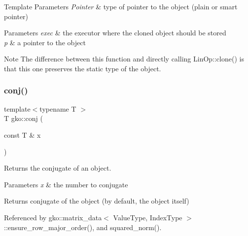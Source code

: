 \begin{DoxyTemplParams}{Template Parameters}
{\em Pointer} & type of pointer to the object (plain or smart pointer)\\
\hline
\end{DoxyTemplParams}

\begin{DoxyParams}{Parameters}
{\em exec} & the executor where the cloned object should be stored \\
\hline
{\em p} & a pointer to the object\\
\hline
\end{DoxyParams}
\begin{DoxyNote}{Note}
The difference between this function and directly calling Lin\+Op\+::clone() is that this one preserves the static type of the object. 
\end{DoxyNote}
\mbox{\label{namespacegko_acdaec5c4f959a948a6d0f3e99a57c7ea}} 
\subsubsection{\texorpdfstring{conj()}{conj()}}
{\footnotesize\ttfamily template$<$typename T $>$ \\
T gko\+::conj (\begin{DoxyParamCaption}\item[{const T \&}]{x }\end{DoxyParamCaption})\hspace{0.3cm}{\ttfamily [inline]}}



Returns the conjugate of an object. 


\begin{DoxyParams}{Parameters}
{\em x} & the number to conjugate\\
\hline
\end{DoxyParams}
\begin{DoxyReturn}{Returns}
conjugate of the object (by default, the object itself) 
\end{DoxyReturn}


Referenced by gko\+::matrix\+\_\+data$<$ Value\+Type, Index\+Type $>$\+::ensure\+\_\+row\+\_\+major\+\_\+order(), and squared\+\_\+norm().

\mbox{\label{namespacegko_ac5cef6e5e9e02b8d77ce01be41117cc0}} 
